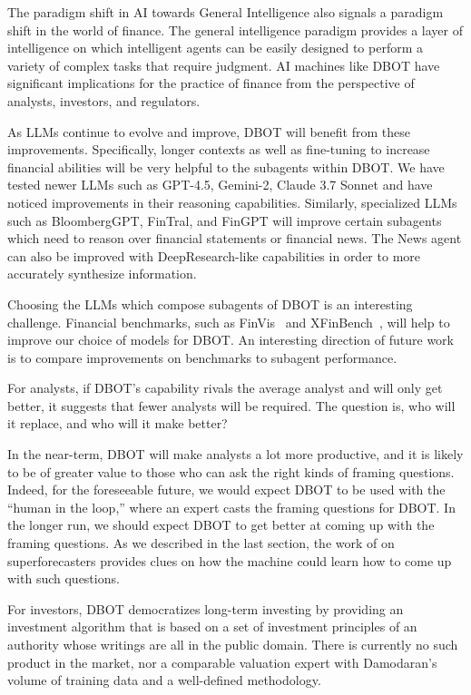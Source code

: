 \documentclass[]{interact}
\theoremstyle{plain}%
\theoremstyle{definition}
\theoremstyle{remark}
\begin{document}
The paradigm shift in AI towards General Intelligence also signals a paradigm shift in the world of finance. The general intelligence paradigm provides a layer of intelligence on which intelligent agents can be easily designed to perform a variety of complex tasks that require judgment. AI machines like DBOT have significant implications for the practice of finance from the perspective of analysts, investors, and regulators.

As LLMs continue to evolve and improve, DBOT will benefit from these improvements. Specifically, longer contexts as well as fine-tuning to increase financial abilities will be very helpful to the subagents within DBOT. We have tested newer LLMs such as GPT-4.5, Gemini-2, Claude 3.7 Sonnet and have noticed improvements in their reasoning capabilities. Similarly, specialized LLMs such as BloombergGPT, FinTral, and FinGPT will improve certain subagents which need to reason over financial statements or financial news. The News agent can also be improved with DeepResearch-like capabilities in order to more accurately synthesize information.

Choosing the LLMs which compose subagents of DBOT is an interesting challenge.  Financial benchmarks, such as FinVis~\cite{wang2023finvis} and XFinBench~\cite{zhang2024finbench}, will help to improve our choice of models for DBOT. An interesting direction of future work is to compare improvements on benchmarks to subagent performance.

For analysts, if DBOT's capability rivals the average analyst and will only get better, it suggests that fewer analysts will be required. The question is, who will it replace, and who will it make better?

In the near-term, DBOT will make analysts a lot more productive, and it is likely to be of greater value to those who can ask the right kinds of framing questions. Indeed, for the foreseeable future, we would expect DBOT to be used with the “human in the loop,” where an expert casts the framing questions for DBOT. In the longer run, we should expect DBOT to get better at coming up with the framing questions. As we described in the last section, the work of \citet{tetlock2016superforecasting} on superforecasters provides clues on how the machine could learn how to come up with such questions.

For investors, DBOT democratizes long-term investing by providing an investment algorithm that is based on a set of investment principles of an authority whose writings are all in the public domain. There is currently no such product in the market, nor a comparable valuation expert with Damodaran's volume of training data and a well-defined methodology.
\end{document}
